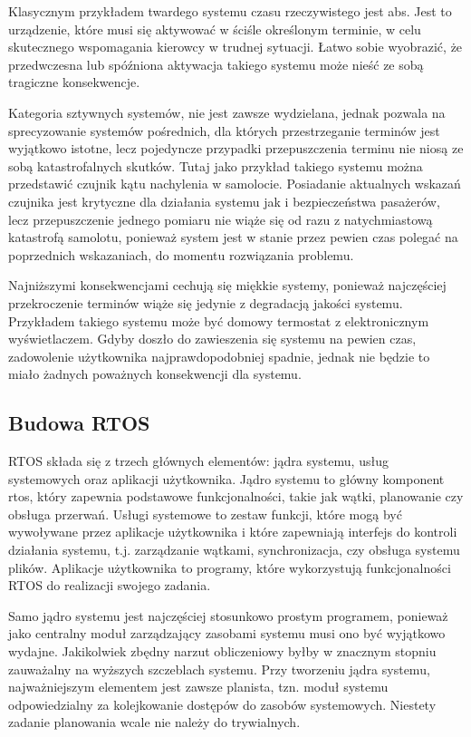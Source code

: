 Klasycznym przykładem twardego systemu czasu rzeczywistego jest \gls{abs}.
Jest to urządzenie, które musi się aktywować w ściśle określonym terminie, w celu skutecznego wspomagania kierowcy w trudnej sytuacji. Łatwo sobie wyobrazić,
że przedwczesna lub spóźniona aktywacja takiego systemu może nieść ze sobą tragiczne konsekwencje.

Kategoria sztywnych systemów, nie jest zawsze wydzielana, jednak pozwala na sprecyzowanie systemów pośrednich, dla których przestrzeganie terminów jest
wyjątkowo istotne, lecz pojedyncze przypadki przepuszczenia terminu nie niosą ze sobą katastrofalnych skutków. Tutaj jako przykład takiego systemu można
przedstawić czujnik kątu nachylenia w samolocie. Posiadanie aktualnych wskazań czujnika jest krytyczne dla działania systemu jak i bezpieczeństwa pasażerów,
lecz przepuszczenie jednego pomiaru nie wiąże się od razu z natychmiastową katastrofą samolotu, ponieważ system jest w stanie przez pewien czas polegać
na poprzednich wskazaniach, do momentu rozwiązania problemu.

Najniższymi konsekwencjami cechują się miękkie systemy, ponieważ najczęściej przekroczenie terminów wiąże się jedynie z degradacją jakości systemu.
Przykładem takiego systemu może być domowy termostat z elektronicznym wyświetlaczem. Gdyby doszło do zawieszenia się systemu na pewien czas,
zadowolenie użytkownika najprawdopodobniej spadnie, jednak nie będzie to miało żadnych poważnych konsekwencji dla systemu.

\subsection{Budowa RTOS}
RTOS składa się z trzech głównych elementów: jądra systemu, usług systemowych oraz aplikacji użytkownika.
Jądro systemu to główny komponent \gls{rtos}, który zapewnia podstawowe funkcjonalności, takie jak wątki, planowanie czy obsługa przerwań.
Usługi systemowe to zestaw funkcji, które mogą być wywoływane przez aplikacje użytkownika i które zapewniają interfejs do kontroli działania systemu,
t.j. zarządzanie wątkami, synchronizacja, czy obsługa systemu plików.
Aplikacje użytkownika to programy, które wykorzystują funkcjonalności RTOS do realizacji swojego zadania.

Samo jądro systemu jest najczęściej stosunkowo prostym programem, ponieważ jako centralny moduł zarządzający zasobami systemu musi ono być
wyjątkowo wydajne. Jakikolwiek zbędny narzut obliczeniowy byłby w znacznym stopniu zauważalny na wyższych szczeblach systemu.
Przy tworzeniu jądra systemu, najważniejszym elementem jest zawsze \gls{planista}, tzn. moduł systemu odpowiedzialny za kolejkowanie dostępów
do zasobów systemowych. Niestety zadanie planowania wcale nie należy do trywialnych.

